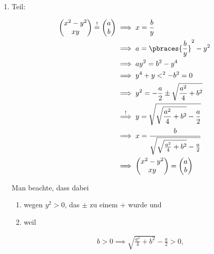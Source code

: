 \begin{solution}

\phantom{}

\begin{enumerate}[label = \arabic*.]

    \item Teil:
    
    \begin{align*}
        \begin{pmatrix}
            x^2 - y^2 \\ x y
        \end{pmatrix}
        \stackrel{!}{=}
        \begin{pmatrix}
            a \\ b
        \end{pmatrix}
        & \implies
        x = \frac{b}{y} \\
        & \implies
        a = \pbraces{\frac{b}{y}}^2 - y^2 \\
        & \implies
        a y^2 = b^2 - y^4 \\
        & \implies
        y^4 + y <^2 - b^2 = 0 \\
        & \implies
        y^2 = -\frac{a}{2} \pm \sqrt{\frac{a^2}{4} + b^2} \\
        & \stackrel{!}{\implies}
        y = \sqrt{\sqrt{\frac{a^2}{4} + b^2} - \frac{a}{2}} \\
        & \implies
        x = \frac{b}{\sqrt{\sqrt{\frac{a^2}{4} + b^2} - \frac{a}{2}}} \\
        & \implies
        \begin{pmatrix}
            x^2 - y^2 \\ x y
        \end{pmatrix}
        =
        \begin{pmatrix}
            a \\ b
        \end{pmatrix}
    \end{align*}

    Man beachte, dass dabei
    
    \begin{enumerate}[label = \arabic*.]

        \item wegen $y^2 > 0$, das $\pm$ zu einem $+$ wurde und

        \item weil 
        
        \begin{align*}
            b > 0
            \implies
            \sqrt{\frac{a^2}{4} + b^2} - \frac{a}{2} > 0,
        \end{align*}


\end{enumerate}
\end{enumerate}
\end{solution}
